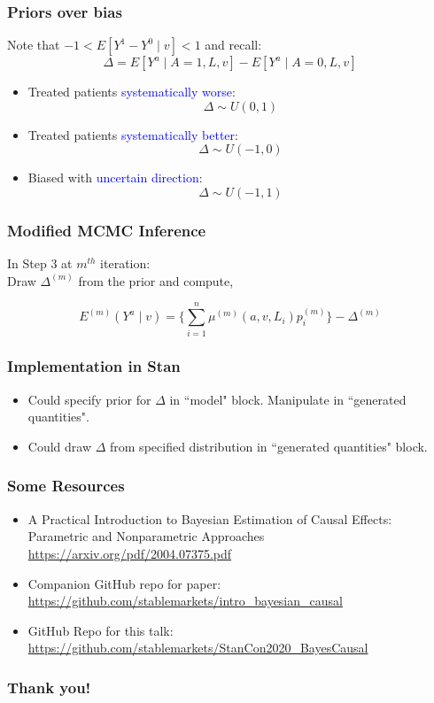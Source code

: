 \documentclass[xcolor=x11names,compress]{beamer}
\renewcommand{\(}{\begin{columns}}
\renewcommand{\)}{\end{columns}}
\newcommand{\<}[1]{\begin{column}{#1}}
\renewcommand{\>}{\end{column}}
\begin{document}
\begin{frame}
	\frametitle{Priors over bias}
	Note that $-1 < E[Y^1 - Y^0 \mid v ] < 1$ and recall:
	$$\Delta  = E[Y^a \mid A=1, L, v] - E[Y^a \mid A=0, L, v] $$
	
	\begin{itemize}
		 
		\item Treated patients \textcolor{blue}{systematically worse}:
		$$ \Delta \sim U(0, 1) $$
		
		 
		\item Treated patients \textcolor{blue}{systematically better}:
		$$ \Delta \sim U(-1, 0) $$
		
		 
		\item Biased with \textcolor{blue}{uncertain direction}:
		$$ \Delta \sim U(-1,1) $$		
	\end{itemize}
\end{frame}

\begin{frame}
	\frametitle{Modified MCMC Inference}

	In Step 3 at $m^{th}$ iteration: \\


	Draw $\Delta^{(m)}$ from the prior and compute, 
	
	$$ E^{(m)}(Y^a \mid v ) =  \Big\{ \sum_{i=1}^n \mu^{(m)}( a, v, L_i ) p_i^{(m)} \Big\} - \Delta^{(m)} $$

\end{frame}

\begin{frame}
	\frametitle{Implementation in Stan}

	\begin{itemize}
		\item Could specify prior for $\Delta$ in ``model" block. Manipulate in ``generated quantities".
		\item Could draw $\Delta$ from specified distribution in ``generated quantities" block.
	\end{itemize}
\end{frame}

\begin{frame}
	\frametitle{Some Resources}

	\begin{itemize}
		\item A Practical Introduction to Bayesian Estimation of Causal Effects: Parametric and Nonparametric Approaches
		\url{https://arxiv.org/pdf/2004.07375.pdf}
		\item Companion GitHub repo for paper:
		\url{https://github.com/stablemarkets/intro_bayesian_causal}
		\item GitHub Repo for this talk:
		\url{https://github.com/stablemarkets/StanCon2020_BayesCausal}
	\end{itemize}
\end{frame}

\begin{frame}
	\frametitle{Thank you!}

\end{frame}
\end{document}
